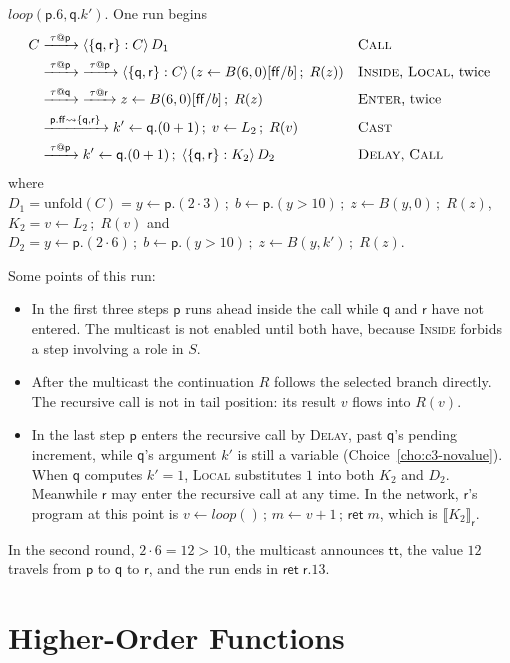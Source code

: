\documentclass[11pt]{report}
\makeatletter
\theoremstyle{plain}
\theoremstyle{definition}
\theoremstyle{remark}
\newcommand{\kw}[1]{\mathsf{#1}}
\newcommand{\pp}{\mathsf{p}}
\newcommand{\qq}{\mathsf{q}}
\newcommand{\rr}{\mathsf{r}}
\newcommand{\ttrue}{\kw{tt}}
\newcommand{\ffalse}{\kw{ff}}
\newcommand{\bind}[3]{#1 \leftarrow #2\,;\;#3}
\newcommand{\cret}[1]{\kw{ret}\;#1}
\newcommand{\rt}[3]{\langle #1 : #2\rangle\,#3}
\newcommand{\unfold}[1]{\mathrm{unfold}(#1)}
\newcommand{\tauat}[1]{\tau\mathord{@}#1}
\newcommand{\castlbl}[3]{#1.#2 \rightsquigarrow #3}
\newcommand{\lto}[1]{\xrightarrow{\;#1\;}}
\newcommand{\proj}[2]{\llbracket #1 \rrbracket_{#2}}
\newcommand{\rn}[1]{{\normalfont\scshape #1}}
\makeatother
\begin{document}
$\mathit{loop}(\pp.6,\qq.k')$.  One run begins
\begin{align*}
  C &\lto{\tauat{\pp}} \rt{\{\qq,\rr\}}{C}{D_1}
    && \text{\rn{Call}}\\
  &\lto{\tauat{\pp}}\;\lto{\tauat{\pp}} \rt{\{\qq,\rr\}}{C}{(\bind{z}{B(6,0)[\ffalse/b]}{R(z)})}
    && \text{\rn{Inside}, \rn{Local}, twice}\\
  &\lto{\tauat{\qq}}\;\lto{\tauat{\rr}} \bind{z}{B(6,0)[\ffalse/b]}{R(z)}
    && \text{\rn{Enter}, twice}\\
  &\lto{\castlbl{\pp}{\ffalse}{\{\qq,\rr\}}} \bind{k'}{\qq.(0+1)}{\bind{v}{L_2}{R(v)}}
    && \text{\rn{Cast}}\\
  &\lto{\tauat{\pp}} \bind{k'}{\qq.(0+1)}{\rt{\{\qq,\rr\}}{K_2}{D_2}}
    && \text{\rn{Delay}, \rn{Call}}
\end{align*}
where $D_1=\unfold{C}=\bind{y}{\pp.(2\cdot 3)}{\bind{b}{\pp.(y>10)}{\bind{z}{B(y,0)}{R(z)}}}$,
$K_2=\bind{v}{L_2}{R(v)}$ and
$D_2=\bind{y}{\pp.(2\cdot 6)}{\bind{b}{\pp.(y>10)}{\bind{z}{B(y,k')}{R(z)}}}$.

Some points of this run:
\begin{itemize}
\item In the first three steps $\pp$ runs ahead inside the call while $\qq$
  and $\rr$ have not entered.  The multicast is not enabled until both have,
  because \rn{Inside} forbids a step involving a role in $S$.
\item After the multicast the continuation $R$ follows the selected branch
  directly.  The recursive call is not in tail position: its result $v$ flows
  into $R(v)$.
\item In the last step $\pp$ enters the recursive call by \rn{Delay}, past
  $\qq$'s pending increment, while $\qq$'s argument $k'$ is still a variable
  (Choice~\ref{cho:c3-novalue}).  When $\qq$ computes $k'=1$, \rn{Local}
  substitutes $1$ into both $K_2$ and $D_2$.  Meanwhile $\rr$ may enter the
  recursive call at any time.  In the network, $\rr$'s program at this point
  is $v\leftarrow\mathit{loop}()\,;\,m\leftarrow v+1\,;\,\kw{ret}\;m$, which
  is $\proj{K_2}{\rr}$.
\end{itemize}
In the second round, $2\cdot 6=12>10$, the multicast announces $\ttrue$, the
value $12$ travels from $\pp$ to $\qq$ to $\rr$, and the run ends in
$\cret{\rr.13}$.

\chapter{Higher-Order Functions}
\label{ch:ho}
\end{document}
